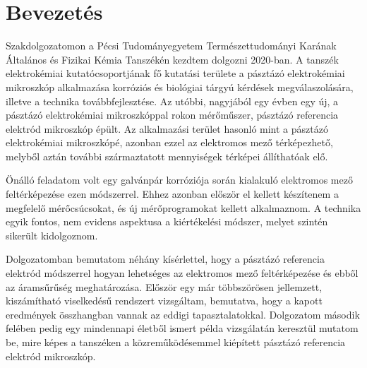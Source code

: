 \chapter{Bevezetés}
\pagestyle{headings}

Szakdolgozatomon a Pécsi Tudományegyetem Természettudományi Karának Általános és Fizikai Kémia Tanszékén kezdtem dolgozni 2020-ban. A tanszék elektrokémiai kutatócsoportjának fő kutatási területe a pásztázó elektrokémiai mikroszkóp alkalmazása korróziós és biológiai tárgyú kérdések megválaszolására, illetve a technika továbbfejlesztése. Az utóbbi, nagyjából egy évben egy új, a pásztázó elektrokémiai mikroszkóppal rokon mérőműszer, pásztázó referencia elektród mikroszkóp épült. Az alkalmazási terület hasonló mint a pásztázó elektrokémiai mikroszkópé, azonban ezzel az elektromos mező térképezhető, melyből aztán további származtatott mennyiségek térképei állíthatóak elő. 

Önálló feladatom volt egy galvánpár korróziója során kialakuló elektromos mező feltérképezése ezen módszerrel. Ehhez azonban először el kellett készítenem a megfelelő mérőcsúcsokat, és új mérőprogramokat kellett alkalmaznom. A technika egyik fontos, nem evidens aspektusa a kiértékelési módszer, melyet szintén sikerült kidolgoznom. 

Dolgozatomban bemutatom néhány kísérlettel, hogy a pásztázó referencia elektród módszerrel hogyan lehetséges az elektromos mező feltérképezése és ebből az áramsűrűség meghatározása. Először egy már többszörösen jellemzett, kiszámítható viselkedésű rendszert vizsgáltam, bemutatva, hogy a kapott eredmények összhangban vannak az eddigi tapasztalatokkal. Dolgozatom második felében pedig egy mindennapi életből ismert példa vizsgálatán keresztül mutatom be, mire képes a tanszéken a közreműködésemmel kiépített pásztázó referencia elektród mikroszkóp.
